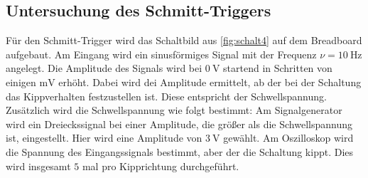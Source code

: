 \subsection{Untersuchung des Schmitt-Triggers}
Für den Schmitt-Trigger wird 
das Schaltbild aus \autoref{fig:schalt4} auf dem Breadboard aufgebaut. 
Am Eingang wird ein sinusförmiges Signal mit der Frequenz $\nu = \qty{10}{\hertz}$ angelegt. 
Die Amplitude des Signals wird bei $\qty{0}{\volt}$ startend in Schritten von einigen $\unit{\milli\volt}$ erhöht.
Dabei wird dei Amplitude ermittelt, ab der bei der Schaltung das Kippverhalten festzustellen ist.
Diese entspricht der Schwellspannung.
\\
Zusätzlich wird die Schwellspannung wie folgt bestimmt:
Am Signalgenerator wird ein Dreieckssignal bei einer Amplitude, die größer als die Schwellspannung ist, eingestellt.
Hier wird eine Amplitude von $\qty{3}{\volt}$ gewählt.
Am Oszilloskop wird die Spannung des Eingangssignals bestimmt, aber der die Schaltung kippt. 
Dies wird insgesamt $5$ mal pro Kipprichtung durchgeführt. 